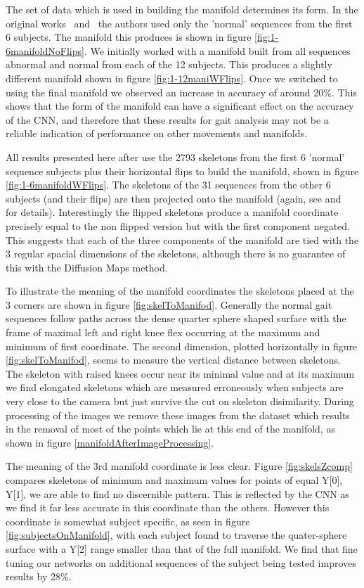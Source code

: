 \documentclass[11pt]{article} %
\begin{document}
The set of data which is used in building the manifold determines its form. In the original works~\cite{Paiement} and~\cite{Tao} the authors used only the 'normal' sequences from the first 6 subjects. The manifold this produces is shown in figure \ref{fig:1-6manifoldNoFlips}. We initially worked with a manifold built from all sequences abnormal and normal from each of the 12 subjects. This produces a slightly different manifold shown in figure \ref{fig:1-12maniWFlips}. Once we switched to using the final manifold we observed an increase in accuracy of around 20\%. This shows that the form of the manifold can have a significant effect on the accuracy of the CNN, and therefore that these results for gait analysis may not be a reliable indication of performance on other movements and manifolds.

All results presented here after use the 2793 skeletons from the first 6 'normal' sequence subjects plus their horizontal flips to build the manifold, shown in figure \ref{fig:1-6manifoldWFlips}. The skeletons of the 31 sequences from the other 6 subjects (and their flips) are then projected onto the manifold (again, see \cite{Paiement} and~\cite{Tao} for details). Interestingly the flipped skeletons produce a manifold coordinate precisely equal to the non flipped version but with the first component negated. This suggests that each of the three components of the manifold are tied with the 3 regular spacial dimensions of the skeletons, although there is no guarantee of this with the Diffusion Maps method. 

To illustrate the meaning of the manifold coordinates the skeletons placed at the 3 corners are shown in figure \ref{fig:skelToManifod}. Generally the normal gait sequences follow paths across the dense quarter sphere shaped surface with the frame of maximal left and right knee flex occurring at the maximum and minimum of first coordinate. The second dimension, plotted horizontally in figure \ref{fig:skelToManifod}, seems to measure the vertical distance between skeletons. The skeleton with raised knees occur near its minimal value and at its maximum we find elongated skeletons which are measured erroneously when subjects are very close to the camera but just survive the cut on skeleton disimilarity. During processing of the images we remove these images from the dataset which results in the removal of most of the points which lie at this end of the manifold, as shown in figure \ref{manifoldAfterImageProcessing}. 

The meaning of the 3rd manifold coordinate is less clear. Figure \ref{fig:skelsZcomp} compares skeletons of minimum and maximum values for points of equal Y[0], Y[1], we are able to find no discernible pattern. This is reflected by the CNN as we find it far less accurate in this coordinate than the others. However this coordinate is somewhat subject specific, as seen in figure \ref{fig:subjectsOnManifold}, with each subject found to traverse the quater-sphere surface with a Y[2] range smaller than that of the full manifold. We find that fine tuning our networks on additional sequences of the subject being tested improves results by 28\%. 
\end{document}
